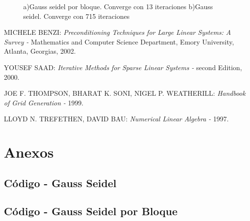 \documentclass[11pt,letterpaper]{article}
\begin{document}
\begin{figure}[H]
\begin{minipage}{.49\linewidth}
	\end{minipage}
	\caption{a)Gauss seidel por bloque. Converge con 13 iteraciones b)Gauss seidel. Converge con 715 iteraciones}
\end{figure}


\clearpage
\begin{thebibliography}{10}
MICHELE BENZI:
\textit{Preconditioning Techniques for Large Linear
Systems: A Survey - }
Mathematics and Computer Science Department, Emory University, Atlanta, Georgias, 2002.
 
YOUSEF SAAD:
\textit{Iterative Methods for Sparse Linear Systems - } 
second Edition, 2000.
 
JOE F. THOMPSON, BHARAT K. SONI, NIGEL P. WEATHERILL:
\textit{Handbook of Grid Generation - }
1999.

LLOYD N. TREFETHEN, DAVID BAU:
\textit{Numerical Linear Algebra - }
1997.

\end{thebibliography}

\clearpage
\section{Anexos}
\subsection{Código - Gauss Seidel}

\subsection{Código - Gauss Seidel por Bloque}

\end{document}
